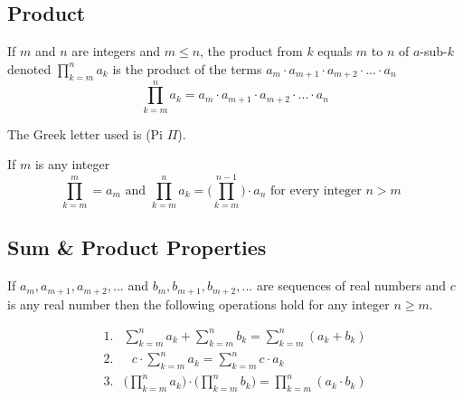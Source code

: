 \documentclass[11pt]{article}
\begin{document}
\subsection{Product}

\begin{definition}[Product]\label{def:product}
    If $m$ and $n$ are integers and $m \leq n$,
    the product from $k$ equals $m$ to $n$ of $a$-sub-$k$ denoted
    $\prod_{k=m}^n a_k$
    is the product of the terms $a_m \cdot a_{m+1} \cdot a_{m+2} \cdot ... \cdot a_n$
    \begin{equation*}
        \prod_{k=m}^n a_k = a_m \cdot a_{m+1} \cdot a_{m+2} \cdot ... \cdot a_n
    \end{equation*}

    The Greek letter used is (Pi $\Pi$).
\end{definition}

\begin{definition}\label{def:recursive-product}
    If $m$ is any integer
    \begin{equation*}
        \prod_{k=m}^m = a_m \text{ and } \prod_{k=m}^n a_k = \Biggl( \prod_{k=m}^{n-1} \Biggl) \cdot a_n \text { for every integer $n > m$ }
    \end{equation*}
\end{definition}

\subsection{Sum \& Product Properties}

\begin{definition}\label{def:props-sums-prods}
    If $a_m, a_{m+1}, a_{m+2}, ...$ and $b_m, b_{m+1}, b_{m+2}, ...$
    are sequences of real numbers and $c$ is any real number then
    the following operations hold for any integer $n \geq m$.

    \begin{align*}
        \text{1.} & \sum_{k=m}^n a_k + \sum_{k=m}^n b_k = \sum_{k=m}^n (a_k + b_k) \\
        \text{2.} & \text{ } c \cdot \sum_{k=m}^n a_k = \sum_{k=m}^n c \cdot a_k \\
        \text{3.} & \Biggl( \prod_{k=m}^n a_k \Biggl) \cdot \Biggl( \prod_{k=m}^n b_k \Biggl) =
                    \prod_{k=m}^n (a_k \cdot b_k) \\
    \end{align*}
\end{definition}
\end{document}
